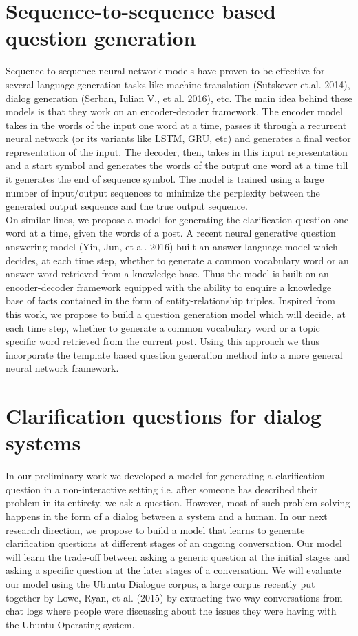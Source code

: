 \documentclass[11pt]{report}
\begin{document}
\newpage
\section{Sequence-to-sequence based question generation}

Sequence-to-sequence neural network models have proven to be effective for several language generation tasks like machine translation (Sutskever et.al. 2014), dialog generation (Serban, Iulian V., et al. 2016), etc. The main idea behind these models is that they work on an encoder-decoder framework. The encoder model takes in the words of the input one word at a time, passes it through a recurrent neural network (or its variants like LSTM, GRU, etc) and generates a final vector representation of the input. The decoder, then, takes in this input representation and a start symbol and generates the words of the output one word at a time till it generates the end of sequence symbol. The model is trained using a large number of input/output sequences to minimize the perplexity between the generated output sequence and the true output sequence.\\

\noindent
On similar lines, we propose a model for generating the clarification question one word at a time, given the words of a post. A recent neural generative question answering model (Yin, Jun, et al.  2016) built an answer language model which decides, at each time step, whether to generate a common vocabulary word or an answer word retrieved from a knowledge base. Thus the model is built on an encoder-decoder framework equipped with the ability to enquire a knowledge base of facts contained in the form of entity-relationship triples. Inspired from this work, we propose to build a question generation model which will decide, at each time step, whether to generate a common vocabulary word or a topic specific word retrieved from the current post. Using this approach we thus incorporate the template based question generation method into a more general neural network framework.

\section{Clarification questions for dialog systems}

In our preliminary work we developed a model for generating a clarification question in a non-interactive setting i.e. after someone has described their problem in its entirety, we ask a question. However, most of such problem solving happens in the form of a dialog between a system and a human. In our next research direction, we propose to build a model that learns to generate  clarification questions at different stages of an ongoing conversation. Our model will learn the trade-off between asking a generic question at the initial stages and asking a specific question at the later stages of a conversation. We will evaluate our model using the Ubuntu Dialogue corpus, a large corpus recently put together by Lowe, Ryan, et al. (2015) by extracting two-way conversations from chat logs where people were discussing about the issues they were having with the Ubuntu Operating system.

\newpage

\begin{small}


\end{small}
\end{document}
